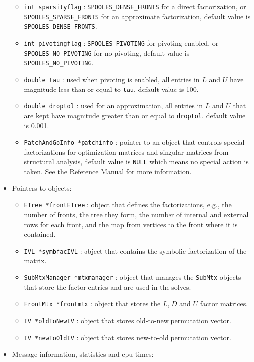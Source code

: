 \begin{itemize}
\begin{itemize}
\item
{\tt int sparsityflag} : 
{\tt SPOOLES\_DENSE\_FRONTS} for a direct factorization,
or {\tt SPOOLES\_SPARSE\_FRONTS} for an approximate factorization,
default value is {\tt SPOOLES\_DENSE\_FRONTS}.
\item
{\tt int pivotingflag} : 
{\tt SPOOLES\_PIVOTING} for pivoting enabled,
or {\tt SPOOLES\_NO\_PIVOTING} for no pivoting,
default value is {\tt SPOOLES\_NO\_PIVOTING}.
\item
{\tt double tau} : used when pivoting is enabled,
all entries in $L$ and $U$ have magnitude less than or equal to
\texttt{tau},
default value is 100.
\item
{\tt double droptol} : used for an approximation,
all entries in $L$ and $U$ that are kept 
have magnitude greater than or equal to \texttt{droptol}.
default value is 0.001.
\item
{\tt PatchAndGoInfo *patchinfo} : pointer to an object that
controls special factorizations for optimization matrices
and singular matrices from structural analysis,
default value is \texttt{NULL} which means no special action is taken.
See the Reference Manual for more information.
\end{itemize}
%
\item Pointers to objects:
\begin{itemize}
\item
{\tt ETree *frontETree} : object that defines the factorizations,
e.g., the number of fronts, the tree they form, the number of
internal and external rows for each front, and the map from
vertices to the front where it is contained.
\item
{\tt IVL *symbfacIVL} : object that contains the symbolic
factorization of the matrix.
\item
{\tt SubMtxManager *mtxmanager} : object that manages the
\texttt{SubMtx} objects that store the factor entries and are used
in the solves.
\item
{\tt FrontMtx *frontmtx} : object that stores the $L$, $D$ and $U$
factor matrices.
\item
{\tt IV *oldToNewIV} : object that stores old-to-new permutation vector.
\item
{\tt IV *newToOldIV} : object that stores new-to-old permutation vector.
\end{itemize}
%
\item Message information, statistics and cpu times:
\begin{itemize}

\end{itemize}
\end{itemize}
